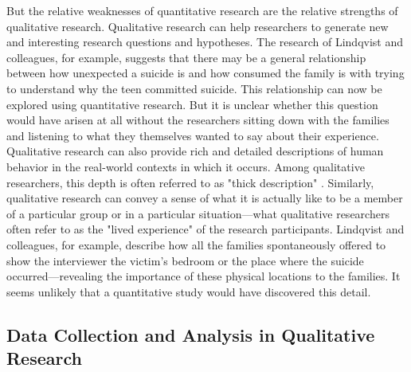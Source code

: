 But the relative weaknesses of quantitative research are the relative strengths of qualitative research. Qualitative research can help researchers to generate new and interesting research questions and hypotheses. The research of Lindqvist and colleagues, for example, suggests that there may be a general relationship between how unexpected a suicide is and how consumed the family is with trying to understand why the teen committed suicide. This relationship can now be explored using quantitative research. But it is unclear whether this question would have arisen at all without the researchers sitting down with the families and listening to what they themselves wanted to say about their experience. Qualitative research can also provide rich and detailed descriptions of human behavior in the real-world contexts in which it occurs. Among qualitative researchers, this depth is often referred to as "thick description" \cite{geertz_interpretation_1973}. Similarly, qualitative research can convey a sense of what it is actually like to be a member of a particular group or in a particular situation---what qualitative researchers often refer to as the "lived experience" of the research participants. Lindqvist and colleagues, for example, describe how all the families spontaneously offered to show the interviewer the victim's bedroom or the place where the suicide occurred---revealing the importance of these physical locations to the families. It seems unlikely that a quantitative study would have discovered this detail.

\subsection{Data Collection and Analysis in Qualitative Research}

